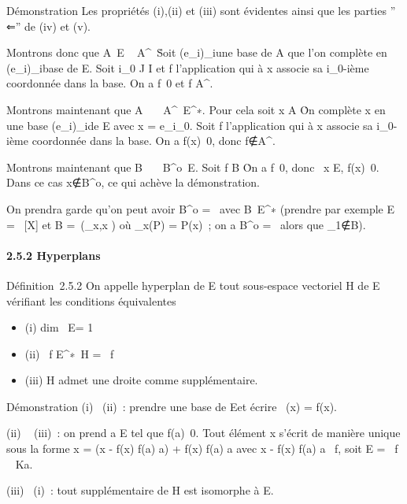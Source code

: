\documentclass[]{article}
\begin{document}
Démonstration Les propriétés (i),(ii) et (iii) sont évidentes ainsi que
les parties '' ⇐'' de (iv) et (v).

Montrons donc que A\neq~E \rigtharrow~
A^\bot\neq~\0\.
Soit (e_i)_i\inI une base de A que l'on complète en
(e_i)_i\inJ base de E. Soit i_0 \in J \diagdown I et f
l'application qui à x associe sa i_0-ième coordonnée dans la
base. On a f\neq~0 et f \in A^\bot.

Montrons maintenant que
A\neq~\0\ \rigtharrow~
A^\bot\neq~E^∗. Pour cela soit
x \in A \diagdown\0\. On complète x en une base
(e_i)_i\inI de E avec x = e_i_0. Soit
f l'application qui à x associe sa i_0-ième coordonnée dans la
base. On a f(x)\neq~0, donc
f∉A^\bot.

Montrons maintenant que
B\neq~\0\ \rigtharrow~
B^o\neq~E. Soit f \in B
\diagdown\0\. On a
f\neq~0, donc \exists~x \in E,
f(x)\neq~0. Dans ce cas
x∉B^o, ce qui achève la
démonstration.

On prendra garde qu'on peut avoir B^o =
\0\ avec
B\neq~E^∗ (prendre par exemple E =
~{[}X{]} et B =\
\mathrmVect(\epsilon_x,x \in {}) où \epsilon_x(P)
= P(x)~; on a B^o = \0\
alors que \epsilon_1∉B).

\paragraph{2.5.2 Hyperplans}

Définition~2.5.2 On appelle hyperplan de E tout sous-espace vectoriel H
de E vérifiant les conditions équivalentes

\begin{itemize}
\itemsep1pt\parskip0pt
\item
  (i) dim~ E\diagupH = 1
\item
  (ii) \exists~f \in
  E^∗\diagdown\0\, H
  = \mathrmKer~f
\item
  (iii) H admet une droite comme supplémentaire.
\end{itemize}

Démonstration (i) \rigtharrow~(ii)~: prendre \overlinee une base
de E\diagupH et écrire \pi~(x) = f(x)\overlinee.

(ii) \rigtharrow~ (iii)~: on prend a \in E tel que f(a)\neq~0.
Tout élément x s'écrit de manière unique sous la forme x = (x - f(x)
\over f(a) a) + f(x) \over f(a) a
avec x - f(x) \over f(a) a
\in\mathrmKer~f, soit E
= \mathrmKer~f \oplus~ Ka.

(iii) \rigtharrow~(i)~: tout supplémentaire de H est isomorphe à E\diagupH.
\end{document}
